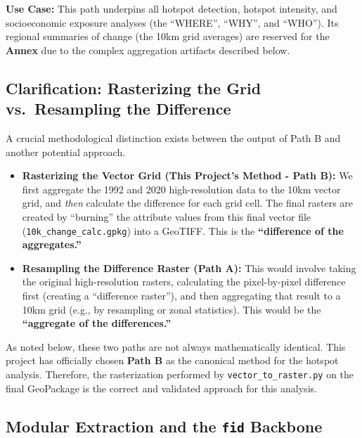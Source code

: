 \documentclass[
  letterpaper,
  DIV=11,
  numbers=noendperiod]{scrreprt}
\begin{document}
\textbf{Use Case:} This path underpins all hotspot detection, hotspot
intensity, and socioeconomic exposure analyses (the ``WHERE'', ``WHY'',
and ``WHO''). Its regional summaries of change (the 10km grid averages)
are reserved for the \textbf{Annex} due to the complex aggregation
artifacts described below.

\subsection{Clarification: Rasterizing the Grid vs.~Resampling the
Difference}\label{clarification-rasterizing-the-grid-vs.-resampling-the-difference}

A crucial methodological distinction exists between the output of Path B
and another potential approach.

\begin{itemize}
\item
  \textbf{Rasterizing the Vector Grid (This Project's Method - Path B):}
  We first aggregate the 1992 and 2020 high-resolution data to the 10km
  vector grid, and \emph{then} calculate the difference for each grid
  cell. The final rasters are created by ``burning'' the attribute
  values from this final vector file (\texttt{10k\_change\_calc.gpkg})
  into a GeoTIFF. This is the \textbf{``difference of the aggregates.''}
\item
  \textbf{Resampling the Difference Raster (Path A):} This would involve
  taking the original high-resolution rasters, calculating the
  pixel-by-pixel difference first (creating a ``difference raster''),
  and then aggregating that result to a 10km grid (e.g., by resampling
  or zonal statistics). This would be the \textbf{``aggregate of the
  differences.''}
\end{itemize}

As noted below, these two paths are not always mathematically identical.
This project has officially chosen \textbf{Path B} as the canonical
method for the hotspot analysis. Therefore, the rasterization performed
by \texttt{vector\_to\_raster.py} on the final GeoPackage is the correct
and validated approach for this analysis.

\subsection{\texorpdfstring{Modular Extraction and the \texttt{fid}
Backbone}{Modular Extraction and the fid Backbone}}\label{modular-extraction-and-the-fid-backbone}
\end{document}
